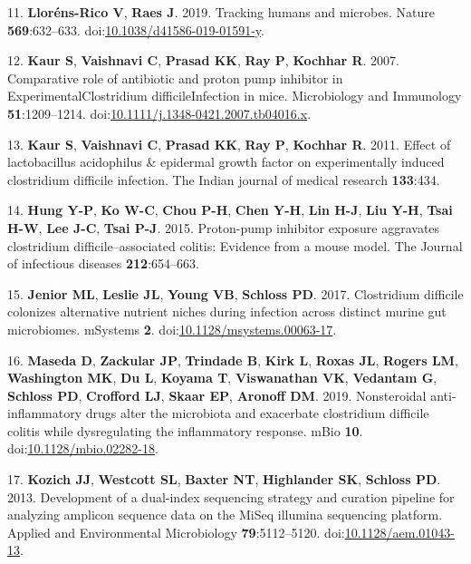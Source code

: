 \documentclass[11pt,]{article}
\begin{document}
\hypertarget{ref-LlornsRico2019}{}
11. \textbf{Lloréns-Rico V}, \textbf{Raes J}. 2019. Tracking humans and
microbes. Nature \textbf{569}:632--633.
doi:\href{https://doi.org/10.1038/d41586-019-01591-y}{10.1038/d41586-019-01591-y}.

\hypertarget{ref-Kaur2007}{}
12. \textbf{Kaur S}, \textbf{Vaishnavi C}, \textbf{Prasad KK},
\textbf{Ray P}, \textbf{Kochhar R}. 2007. Comparative role of antibiotic
and proton pump inhibitor in ExperimentalClostridium difficileInfection
in mice. Microbiology and Immunology \textbf{51}:1209--1214.
doi:\href{https://doi.org/10.1111/j.1348-0421.2007.tb04016.x}{10.1111/j.1348-0421.2007.tb04016.x}.

\hypertarget{ref-kaur2011effect}{}
13. \textbf{Kaur S}, \textbf{Vaishnavi C}, \textbf{Prasad KK},
\textbf{Ray P}, \textbf{Kochhar R}. 2011. Effect of lactobacillus
acidophilus \& epidermal growth factor on experimentally induced
clostridium difficile infection. The Indian journal of medical research
\textbf{133}:434.

\hypertarget{ref-hung2015proton}{}
14. \textbf{Hung Y-P}, \textbf{Ko W-C}, \textbf{Chou P-H}, \textbf{Chen
Y-H}, \textbf{Lin H-J}, \textbf{Liu Y-H}, \textbf{Tsai H-W}, \textbf{Lee
J-C}, \textbf{Tsai P-J}. 2015. Proton-pump inhibitor exposure aggravates
clostridium difficile--associated colitis: Evidence from a mouse model.
The Journal of infectious diseases \textbf{212}:654--663.

\hypertarget{ref-Jenior2017}{}
15. \textbf{Jenior ML}, \textbf{Leslie JL}, \textbf{Young VB},
\textbf{Schloss PD}. 2017. Clostridium difficile colonizes alternative
nutrient niches during infection across distinct murine gut microbiomes.
mSystems \textbf{2}.
doi:\href{https://doi.org/10.1128/msystems.00063-17}{10.1128/msystems.00063-17}.

\hypertarget{ref-Maseda2019}{}
16. \textbf{Maseda D}, \textbf{Zackular JP}, \textbf{Trindade B},
\textbf{Kirk L}, \textbf{Roxas JL}, \textbf{Rogers LM},
\textbf{Washington MK}, \textbf{Du L}, \textbf{Koyama T},
\textbf{Viswanathan VK}, \textbf{Vedantam G}, \textbf{Schloss PD},
\textbf{Crofford LJ}, \textbf{Skaar EP}, \textbf{Aronoff DM}. 2019.
Nonsteroidal anti-inflammatory drugs alter the microbiota and exacerbate
clostridium difficile colitis while dysregulating the inflammatory
response. mBio \textbf{10}.
doi:\href{https://doi.org/10.1128/mbio.02282-18}{10.1128/mbio.02282-18}.

\hypertarget{ref-Kozich2013}{}
17. \textbf{Kozich JJ}, \textbf{Westcott SL}, \textbf{Baxter NT},
\textbf{Highlander SK}, \textbf{Schloss PD}. 2013. Development of a
dual-index sequencing strategy and curation pipeline for analyzing
amplicon sequence data on the MiSeq illumina sequencing platform.
Applied and Environmental Microbiology \textbf{79}:5112--5120.
doi:\href{https://doi.org/10.1128/aem.01043-13}{10.1128/aem.01043-13}.
\end{document}
